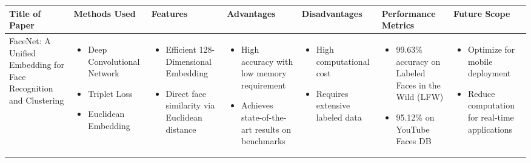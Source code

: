 \documentclass{article}
\begin{document}
\begin{adjustbox}{width=\textwidth}
\begin{tabular}{|p{}|p{}|p{}|p{}|p{}|p{}|p{}|}
    \hline
    \rowcolor[HTML]{D3D3D3}
    \textbf{Title of Paper} & \textbf{Methods Used} & \textbf{Features} & \textbf{Advantages} & \textbf{Disadvantages} & \textbf{Performance Metrics} & \textbf{Future Scope} \\
    
    \hline
    FaceNet: A Unified Embedding for Face Recognition and Clustering & 
    \begin{itemize}[leftmargin=*]
        \item Deep Convolutional Network
        \item Triplet Loss
        \item Euclidean Embedding
    \end{itemize} & 
    \begin{itemize}[leftmargin=*]
        \item Efficient 128-Dimensional Embedding
        \item Direct face similarity via Euclidean distance
    \end{itemize} & 
    \begin{itemize}[leftmargin=*]
        \item High accuracy with low memory requirement
        \item Achieves state-of-the-art results on benchmarks
    \end{itemize} & 
    \begin{itemize}[leftmargin=*]
        \item High computational cost
        \item Requires extensive labeled data
    \end{itemize} & 
    \begin{itemize}[leftmargin=*]
        \item 99.63\% accuracy on Labeled Faces in the Wild (LFW)
        \item 95.12\% on YouTube Faces DB
    \end{itemize} & 
    \begin{itemize}[leftmargin=*]
        \item Optimize for mobile deployment
        \item Reduce computation for real-time applications
    \end{itemize} \\

\end{tabular}
\end{adjustbox}
\end{document}
